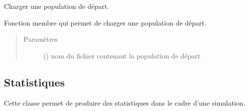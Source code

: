 \documentclass[letterpaper,10pt,french]{sphinxmanual}
\begin{document}
\begin{fulllineitems}
\begin{fulllineitems}
\begin{quote}
\begin{description}
\end{description}\end{quote}

\end{fulllineitems}


\begin{fulllineitems}
\label{\detokenize{code:simgen.model.startpop}}
Charger une population de départ.

Fonction membre qui permet de charger une population de départ.
\begin{quote}\begin{description}
\item[{Paramètres}] \leavevmode
{} () \textendash{} nom du fichier contenant la population de départ

\end{description}\end{quote}

\end{fulllineitems}


\end{fulllineitems}



\subsection{Statistiques}
\label{\detokenize{code:statistiques}}
Cette classe permet de produire des statistiques dans le cadre d’une simulation.
\end{document}

